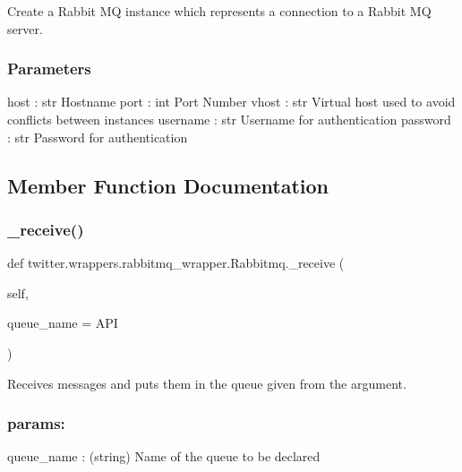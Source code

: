 Create a Rabbit MQ instance which represents a connection to a Rabbit MQ server. 

\subsubsection*{Parameters }

host \+: str Hostname port \+: int Port Number vhost \+: str Virtual host used to avoid conflicts between instances username \+: str Username for authentication password \+: str Password for authentication 

\subsection{Member Function Documentation}
\mbox{\label{classtwitter_1_1wrappers_1_1rabbitmq__wrapper_1_1Rabbitmq_a430a4af33557422e4a0575323b6d7027}} 
\subsubsection{\texorpdfstring{\+\_\+receive()}{\_receive()}}
{\footnotesize\ttfamily def twitter.\+wrappers.\+rabbitmq\+\_\+wrapper.\+Rabbitmq.\+\_\+receive (\begin{DoxyParamCaption}\item[{}]{self,  }\item[{}]{queue\+\_\+name = {\ttfamily \textquotesingle{}API\textquotesingle{}} }\end{DoxyParamCaption})\hspace{0.3cm}{\ttfamily [private]}}



Receives messages and puts them in the queue given from the argument. 

\subsubsection*{params\+: }

queue\+\_\+name \+: (string) Name of the queue to be declared \mbox{\label{classtwitter_1_1wrappers_1_1rabbitmq__wrapper_1_1Rabbitmq_aff19e59d7fd9025f21972e331a1fdfde}} 
